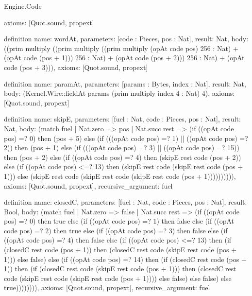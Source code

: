 \begin{lexlean}{Engine.Code}
\begin{semanticmodule}
{  axioms: [Quot.sound, propext]
}

definition{
  name: wordAt,
  parameters: [code : Pieces, pos : Nat],
  result: Nat,
  body: ((prim multiply ((prim multiply ((prim multiply (opAt code pos) 256 : Nat) + (opAt code (pos + 1))) 256 : Nat) + (opAt code (pos + 2))) 256 : Nat) + (opAt code (pos + 3))),
  axioms: [Quot.sound, propext]
}

definition{
  name: paramAt,
  parameters: [params : Bytes, index : Nat],
  result: Nat,
  body: (Kernel.Wire::fieldAt params (prim multiply index 4 : Nat) 4),
  axioms: [Quot.sound, propext]
}

definition{
  name: skipE,
  parameters: [fuel : Nat, code : Pieces, pos : Nat],
  result: Nat,
  body: (match fuel
    | Nat.zero => pos
    | Nat.succ rest => (if ((opAt code pos) =? 0) then (pos + 5) else (if (((opAt code pos) =? 1) || ((opAt code pos) =? 2)) then (pos + 1) else (if (((opAt code pos) =? 3) || ((opAt code pos) =? 15)) then (pos + 2) else (if ((opAt code pos) =? 4) then (skipE rest code (pos + 2)) else (if ((opAt code pos) <=? 13) then (skipE rest code (skipE rest code (pos + 1))) else (skipE rest code (skipE rest code (skipE rest code (pos + 1)))))))))),
  axioms: [Quot.sound, propext],
  recursive_argument: fuel
}

definition{
  name: closedC,
  parameters: [fuel : Nat, code : Pieces, pos : Nat],
  result: Bool,
  body: (match fuel
    | Nat.zero => false
    | Nat.succ rest => (if ((opAt code pos) =? 0) then true else (if ((opAt code pos) =? 1) then false else (if ((opAt code pos) =? 2) then true else (if ((opAt code pos) =? 3) then false else (if ((opAt code pos) =? 4) then false else (if ((opAt code pos) <=? 13) then (if (closedC rest code (pos + 1)) then (closedC rest code (skipE rest code (pos + 1))) else false) else (if ((opAt code pos) =? 14) then (if (closedC rest code (pos + 1)) then (if (closedC rest code (skipE rest code (pos + 1))) then (closedC rest code (skipE rest code (skipE rest code (pos + 1)))) else false) else false) else true)))))))),
  axioms: [Quot.sound, propext],
  recursive_argument: fuel
}


\end{semanticmodule}
\end{lexlean}
